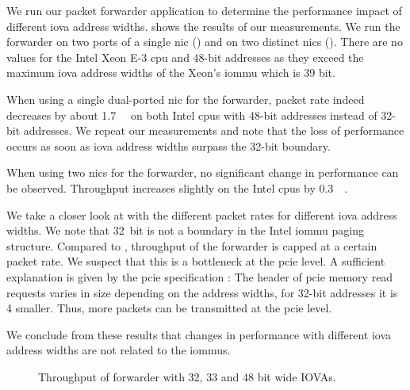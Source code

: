 We run our packet forwarder application to determine the performance impact of
different \ac{iova} address widths. 
shows the results of our measurements. We run the forwarder on two ports of a
single \ac{nic} () and on
two distinct \acp{nic} ().
There are no values for the Intel Xeon E-3 \ac{cpu} and 48-bit addresses as they
exceed the maximum \ac{iova} address widths of the Xeon's \ac{iommu} which is 39
bit.

When using a single dual-ported \ac{nic} for the forwarder, packet rate indeed
decreases by about \SI{1.7}{\mega\pps} on both Intel \acp{cpu} with 48-bit
addresses instead of 32-bit addresses. We repeat our measurements and note that
the loss of performance occurs as soon as \ac{iova} address widths surpass the
32-bit boundary.

When using two \acp{nic} for the forwarder, no significant change in performance
can be observed. Throughput increases slightly on the Intel \acp{cpu} by
\SI{0.3}{\mega\pps}.

We take a closer look at 
with the different packet rates for different \ac{iova} address widths. We note
that 32~bit is not a boundary in the Intel \ac{iommu} paging structure. Compared
to , throughput of the
forwarder is capped at a certain packet rate. We suspect that this is a
bottleneck at the \ac{pcie} level. A sufficient explanation is given by the
\ac{pcie} specification \cite{pcie2017specification}: The header of \ac{pcie}
memory read requests varies in size depending on the address widths, for 32-bit
addresses it is \SI{4}{\byte} smaller. Thus, more packets can be transmitted at
the \ac{pcie} level.

We conclude from these results that changes in performance with different
\ac{iova} address widths are not related to the \acp{iommu}.

\begin{figure}%
	\centering

    \caption{Throughput of forwarder with 32, 33 and 48 bit wide IOVAs.}
	\label{fig:iova-address-widths-throughput}
\end{figure}


